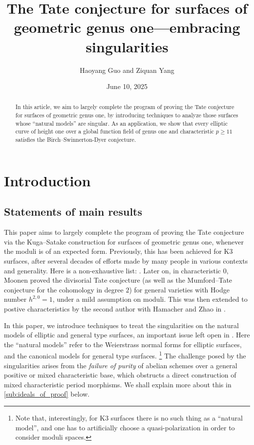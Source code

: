 \documentclass[11pt, letterpaper]{amsart}
\title{The Tate conjecture for surfaces of geometric genus one---embracing singularities}
\author{Haoyang Guo and Ziquan Yang}
\date{June 10, 2025}
\theoremstyle{plain}
\theoremstyle{definition}
\newcommand{\<}{\langle}
\renewcommand{\>}{\rangle}
\begin{document}
\begin{abstract}
    In this article, we aim to largely complete the program of proving the Tate conjecture for surfaces of geometric genus one, by introducing techniques to analyze those surfaces whose ``natural models'' are singular. 
    As an application, we show that every elliptic curve of height one over a global function field of genus one and characteristic $p \ge 11$ satisfies the Birch--Swinnerton-Dyer conjecture. 
\end{abstract}

\maketitle

\vspace{-2em}
\tableofcontents




\section{Introduction}
\subsection{Statements of main results}
This paper aims to largely complete the program of proving the Tate conjecture via the Kuga--Satake construction for surfaces of geometric genus one, whenever the moduli is of an expected form. 
Previously, this has been achieved for K3 surfaces, after several decades of efforts made by many people in various contexts and generality. 
Here is a non-exhaustive list: \cite{DelK3Weil, Nygaard, NO, Tan1, Tan2, Andre, Charles, Maulik, MPTate, KimMP16, IIK}. 
Later on, in characteristic $0$, Moonen \cite{Moonen} proved the divisorial Tate conjecture (as well as the Mumford--Tate conjecture for the cohomology in degree $2$) for general varieties with Hodge number $h^{2, 0} = 1$, under a mild assumption on moduli. 
This was then extended to postive characteristics by the second author with Hamacher and Zhao in \cite{HYZ}. 



In this paper, we introduce techniques to treat the singularities on the natural models of elliptic and general type surfaces, an important issue left open in \cite{HYZ}. 
Here the ``natural models'' refer to the Weierstrass normal forms for elliptic surfaces, and the canonical models for general type surfaces.
\footnote{Note that, interestingly, for K3 surfaces there is no such thing as a ``natural model'', and one has to artificially choose a quasi-polarization in order to consider moduli spaces.}
The challenge posed by the singularities arises from the \textit{failure of purity} of abelian schemes over a general positive or mixed characteristic base, which obstructs a direct construction of mixed characteristic period morphisms. 
We shall explain more about this in \cref{sub:ideals_of_proof} below.
\end{document}
